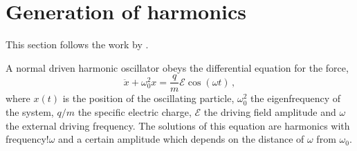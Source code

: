 \documentclass[11pt, english, fleqn, DIV=15, headinclude, BCOR=2cm]{scrreprt}
\begin{document}
% 
% 
% 
% 
% 
\section{Generation of harmonics}

This section follows the work by
\textcite[Chapter~12]{meschede/optik_licht_laser/2008}.

A normal driven harmonic oscillator obeys the differential equation for the
force,
\[
    \ddot x + \omega_0^2 x = \frac qm \mathcal E \cos(\omega t) \,,
\]
where $x(t)$ is the position of the oscillating particle, $\omega_0^2$ the
eigenfrequency of the system, $q/m$ the specific electric charge, $\mathcal E$
the driving field amplitude and $\omega$ the external driving frequency. The
solutions of this equation are harmonics with frequency!$\omega$ and a certain
amplitude which depends on the distance of $\omega$ from $\omega_0$.
\end{document}
